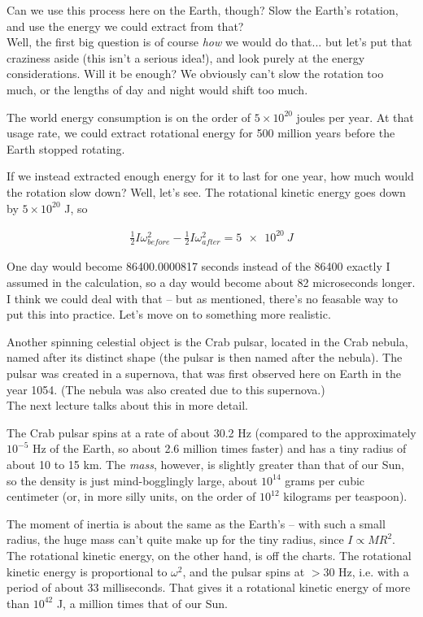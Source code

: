 \documentclass[12pt,a4paper]{report}
\begin{document}
Can we use this process here on the Earth, though? Slow the Earth's rotation, and use the energy we could extract from that?\\
Well, the first big question is of course \emph{how} we would do that... but let's put that craziness aside (this isn't a serious idea!), and look purely at the energy considerations. Will it be enough? We obviously can't slow the rotation too much, or the lengths of day and night would shift too much.

The world energy consumption is on the order of $5 \times 10^{20}$ joules per year. At that usage rate, we could extract rotational energy for 500 million years before the Earth stopped rotating.

If we instead extracted enough energy for it to last for one year, how much would the rotation slow down? Well, let's see. The rotational kinetic energy goes down by $5 \times 10^{20}$ J, so

\begin{align}
\frac{1}{2} I \omega_{before}^2 - \frac{1}{2} I \omega_{after}^2 = \SI{5e20}{J}
\end{align}

One day would become 86400.0000817 seconds instead of the 86400 exactly I assumed in the calculation, so a day would become about 82 microseconds longer. I think we could deal with that -- but as mentioned, there's no feasable way to put this into practice. Let's move on to something more realistic.

Another spinning celestial object is the Crab pulsar, located in the Crab nebula, named after its distinct shape (the pulsar is then named after the nebula). The pulsar was created in a supernova, that was first observed here on Earth in the year 1054. (The nebula was also created due to this supernova.)\\
The next lecture talks about this in more detail.

The Crab pulsar spins at a rate of about 30.2 Hz (compared to the approximately $10^{-5}$ Hz of the Earth, so about 2.6 million times faster) and has a tiny radius of about 10 to 15 km. The \emph{mass}, however, is slightly greater than that of our Sun, so the density is just mind-bogglingly large, about $10^{14}$ grams per cubic centimeter (or, in more silly units, on the order of $10^{12}$ kilograms per teaspoon).

The moment of inertia is about the same as the Earth's -- with such a small radius, the huge mass can't quite make up for the tiny radius, since $I \propto M R^2$.\\
The rotational kinetic energy, on the other hand, is off the charts. The rotational kinetic energy is proportional to $\omega^2$, and the pulsar spins at $>30$ Hz, i.e. with a period of about 33 milliseconds. That gives it a rotational kinetic energy of more than $10^{42}$ J, a million times that of our Sun.
\end{document}
